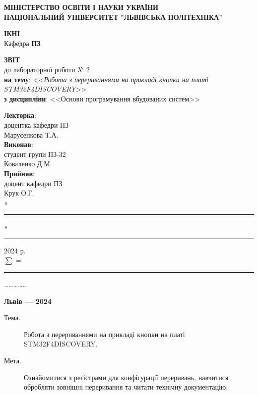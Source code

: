 \documentclass[oneside,14pt]{extarticle}
\newcommand\subject{Основи програмування вбудованих систем}
\newcommand\lecturer{доцентка кафедри ПЗ\\Марусенкова Т.А.}
\newcommand\teacher{доцент кафедри ПЗ\\Крук О.Г.}
\newcommand\mygroup{ПЗ-32}
\newcommand\lab{2}
\newcommand\theme{Робота з перериваннями на прикладі кнопки на платі STM32F4DISCOVERY}
\newcommand\purpose{Ознайомитися з регістрами для конфігурації переривань, навчитися обробляти зовнішні переривання та читати технічну документацію}
\begin{document}
\begin{normalsize}
	\begin{titlepage}
		\thispagestyle{empty}
		\begin{center}
			\textbf{МІНІСТЕРСТВО ОСВІТИ І НАУКИ УКРАЇНИ\\
				НАЦІОНАЛЬНИЙ УНІВЕРСИТЕТ "ЛЬВІВСЬКА ПОЛІТЕХНІКА"}
		\end{center}
		\begin{flushright}
			\textbf{ІКНІ}\\
			Кафедра \textbf{ПЗ}
		\end{flushright}
		\vspace{80pt}
		\begin{center}
			\textbf{ЗВІТ}\\
			\vspace{10pt}
			до лабораторної роботи № \lab\\
			\textbf{на тему}: <<\textit{\theme}>>\\
			\textbf{з дисципліни}: <<\subject>>
		\end{center}
		\vspace{80pt}
		\begin{flushright}
			
			\textbf{Лекторка}:\\
			\lecturer\\
			\vspace{28pt}
			\textbf{Виконав}:\\
			
			студент групи \mygroup\\
			Коваленко Д.М.\\
			\vspace{28pt}
			\textbf{Прийняв}:\\
			
			\teacher\\
			
			\vspace{28pt}
			«\rule{1cm}{0.15mm}» \rule{1.5cm}{0.15mm} 2024 р.\\
			$\sum$ = \rule{1cm}{0.15mm}……………\\
			
		\end{flushright}
		\vspace{\fill}
		\begin{center}
			\textbf{Львів — 2024}
		\end{center}
	\end{titlepage}
		
	\begin{description}
		\item[Тема.] \theme.
		\item[Мета.] \purpose.
	\end{description}


\end{normalsize}
\end{document}
